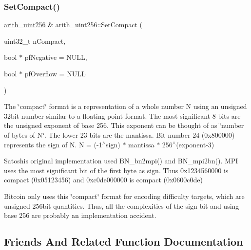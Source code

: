 \mbox{\label{classarith__uint256_a458133c9f123519646b07e6143f2164f}} 
\subsubsection{\texorpdfstring{Set\+Compact()}{SetCompact()}}
{\footnotesize\ttfamily \mbox{\hyperlink{classarith__uint256}{arith\+\_\+uint256}} \& arith\+\_\+uint256\+::\+Set\+Compact (\begin{DoxyParamCaption}\item[{uint32\+\_\+t}]{n\+Compact,  }\item[{bool $\ast$}]{pf\+Negative = {\ttfamily NULL},  }\item[{bool $\ast$}]{pf\+Overflow = {\ttfamily NULL} }\end{DoxyParamCaption})}

The \char`\"{}compact\char`\"{} format is a representation of a whole number N using an unsigned 32bit number similar to a floating point format. The most significant 8 bits are the unsigned exponent of base 256. This exponent can be thought of as \char`\"{}number of bytes of N\char`\"{}. The lower 23 bits are the mantissa. Bit number 24 (0x800000) represents the sign of N. N = (-\/1$^\wedge$sign) $\ast$ mantissa $\ast$ 256$^\wedge$(exponent-\/3)

Satoshi\textquotesingle{}s original implementation used B\+N\+\_\+bn2mpi() and B\+N\+\_\+mpi2bn(). M\+PI uses the most significant bit of the first byte as sign. Thus 0x1234560000 is compact (0x05123456) and 0xc0de000000 is compact (0x0600c0de)

Bitcoin only uses this \char`\"{}compact\char`\"{} format for encoding difficulty targets, which are unsigned 256bit quantities. Thus, all the complexities of the sign bit and using base 256 are probably an implementation accident. 

\subsection{Friends And Related Function Documentation}
\mbox{\label{classarith__uint256_aef075fd8d1a7e5937e9775b8e82c8a1b}} 
